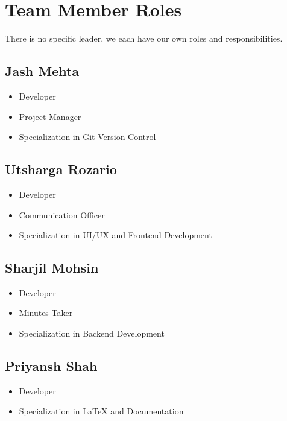 \documentclass{article}
\begin{document}
\section{Team Member Roles}
There is no specific leader, we each have our own roles and responsibilities.

\subsection*{Jash Mehta}

\begin{itemize}
	\item Developer
	\item Project Manager
  \item Specialization in Git Version Control 
\end{itemize}

\subsection*{Utsharga Rozario}

\begin{itemize}
	\item Developer
	\item Communication Officer
  \item Specialization in UI/UX and Frontend Development
\end{itemize}

\subsection*{Sharjil Mohsin}

\begin{itemize}
	\item Developer
	\item Minutes Taker
  \item Specialization in Backend Development
\end{itemize}

\subsection*{Priyansh Shah}

\begin{itemize}
	\item Developer
  \item Specialization in LaTeX and Documentation
\end{itemize}
\end{document}

